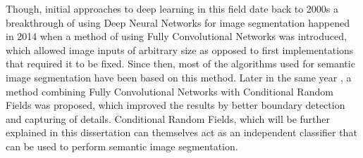 Though, initial approaches to deep learning in this field date back to 2000s \cite{deep_learning_Ciresan} a breakthrough of using Deep Neural Networks for image segmentation happened in 2014 \cite{cnn_shelhamer} when a method of using Fully Convolutional Networks was introduced, which allowed image inputs of arbitrary size as opposed to first implementations that required it to be fixed. Since then, most of the algorithms used for semantic image segmentation have been based on this method.  Later in the same year \cite{cnn_liang}, a method combining Fully Convolutional Networks with Conditional Random Fields was proposed, which improved the results by better boundary detection and capturing of details. Conditional Random Fields, which will be further explained in this dissertation can themselves act as an independent classifier that can be used to perform semantic image segmentation. 
